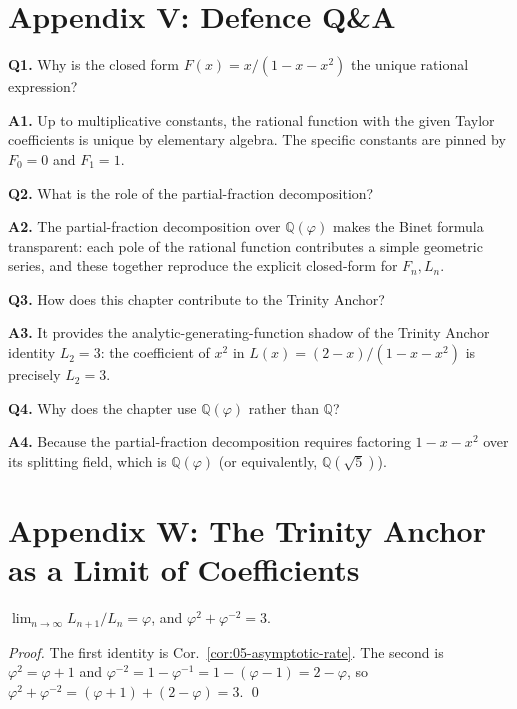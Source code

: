 \section*{Appendix V: Defence Q\&A}
\label{sec:05-app-V}

\textbf{Q1.} Why is the closed form $F(x) = x/(1-x-x^2)$ the unique
rational expression?

\textbf{A1.} Up to multiplicative constants, the rational function
with the given Taylor coefficients is unique by elementary algebra. The
specific constants are pinned by $F_0 = 0$ and $F_1 = 1$.

\textbf{Q2.} What is the role of the partial-fraction decomposition?

\textbf{A2.} The partial-fraction decomposition over $\mathbb{Q}(\varphi)$
makes the Binet formula transparent: each pole of the rational function
contributes a simple geometric series, and these together reproduce
the explicit closed-form for $F_n, L_n$.

\textbf{Q3.} How does this chapter contribute to the Trinity Anchor?

\textbf{A3.} It provides the analytic-generating-function shadow of
the Trinity Anchor identity $L_2 = 3$: the coefficient of $x^2$ in
$L(x) = (2-x)/(1-x-x^2)$ is precisely $L_2 = 3$.

\textbf{Q4.} Why does the chapter use $\mathbb{Q}(\varphi)$ rather than
$\mathbb{Q}$?

\textbf{A4.} Because the partial-fraction decomposition requires
factoring $1 - x - x^2$ over its splitting field, which is
$\mathbb{Q}(\varphi)$ (or equivalently, $\mathbb{Q}(\sqrt{5})$).

\section*{Appendix W: The Trinity Anchor as a Limit of Coefficients}
\label{sec:05-app-W}

\begin{lemma}
\label{lem:05-coef-limit}
$\lim_{n \to \infty} L_{n+1}/L_n = \varphi$, and $\varphi^2 + \varphi^{-2} = 3$.
\end{lemma}

\begin{proof}
The first identity is Cor.~\ref{cor:05-asymptotic-rate}. The second is
$\varphi^2 = \varphi + 1$ and $\varphi^{-2} = 1 - \varphi^{-1} = 1 - (\varphi - 1) = 2 - \varphi$,
so $\varphi^2 + \varphi^{-2} = (\varphi + 1) + (2 - \varphi) = 3$. \qed
\end{proof}

